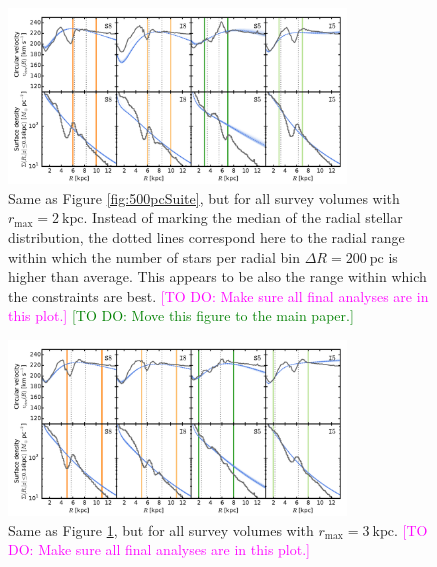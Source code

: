 \documentclass[iop,revtex4,numberedappendix,appendixfloats]{emulateapj}
\newcommand{\Wilma}[1]{\textcolor{Magenta}{#1}}
\newcommand{\HW}[1]{\textcolor{Green}{#1}}
\begin{document}
\begin{appendix}
\begin{figure}[!htbp]
\centering
\includegraphics[width=0.8\textwidth]{fig/MNdHHdiffSph2_vcirc_surfdens_2kpcSuite.pdf}
\caption{Same as Figure \ref{fig:500pcSuite}, but for all survey volumes with $r_\text{max}=2~\text{kpc}$. Instead of marking the median of the radial stellar distribution, the dotted lines correspond here to the radial range within which the number of stars per radial bin $\Delta R = 200~\text{pc}$ is higher than average. This appears to be also the range within which the constraints are best. \Wilma{[TO DO: Make sure all final analyses are in this plot.]} \HW{[TO DO: Move this figure to the main paper.]}}
\label{fig:2kpcSuite}
\end{figure}

\begin{figure}[!htbp]
\centering
\includegraphics[width=0.8\textwidth]{fig/MNdHHdiffSph2_vcirc_surfdens_3kpcSuite.pdf}
\caption{Same as Figure \ref{fig:2kpcSuite}, but for all survey volumes with $r_\text{max}=3~\text{kpc}$. \Wilma{[TO DO: Make sure all final analyses are in this plot.]}}
\label{fig:????}
\end{figure}


\end{appendix}
\end{document}
